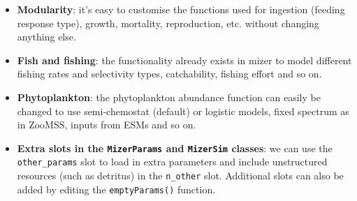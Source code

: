\documentclass[
]{article}
\begin{document}
\begin{itemize}
\item
  \textbf{Modularity}: it's easy to customise the functions used for
  ingestion (feeding response type), growth, mortality, reproduction,
  etc. without changing anything else.
\item
  \textbf{Fish and fishing}: the functionality already exists in mizer
  to model different fishing rates and selectivity types, catchability,
  fishing effort and so on.
\item
  \textbf{Phytoplankton}: the phytoplankton abundance function can
  easily be changed to use semi-chemostat (default) or logistic models,
  fixed spectrum as in ZooMSS, inputs from ESMs and so on.
\item
  \textbf{Extra slots in the \texttt{MizerParams} and \texttt{MizerSim}
  classes}: we can use the \texttt{other\_params} slot to load in extra
  parameters and include unstructured resources (such as detritus) in
  the \texttt{n\_other} slot. Additional slots can also be added by
  editing the \texttt{emptyParams()} function.
\end{itemize}
\end{document}
